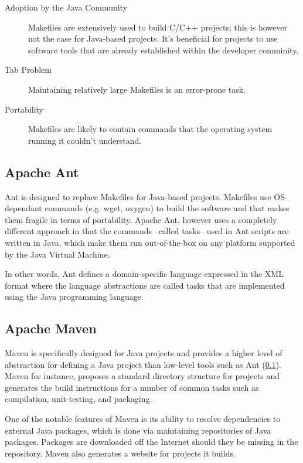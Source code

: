 \begin{description}
\item[Adoption by the Java Community] 
Makefiles are extensively used to build C/C++ projects; this is however
not the case for Java-based projects. It's beneficial for projects
to use software tools that are already established within the
developer comminity.
\item[Tab Problem]
Maintaining relatively large Makefiles is an error-prone task.
\item[Portability]
Makefiles are likely to contain commands that the operating system
running it couldn't understand.
\end{description}

\subsection{Apache Ant}\label{BuildSystemToolsAnt}
Ant is designed to replace Makefiles for Java-based projects. Makefiles use
OS-dependant commands (e.g. wget, oxygen) to build the software and that
makes them fragile in terms of portability. Apache Ant, however uses
a completely different approach in that the commands --called tasks--
used in Ant scripts are written in Java, which make them run out-of-the-box
on any platform supported by the Java Virtual Machine.

In other words, Ant defines a domain-specific language expressed in the
XML format where the language abstractions are called tasks that are 
implemented using the Java programming language.

\subsection{Apache Maven}\label{BuildSystemToolsMaven}
Maven is specifically designed for Java projects and provides a higher
level of abstraction for defining a Java project than low-level tools
such as Ant (\ref{BuildSystemToolsAnt}). 
Maven for instance, proposes a standard directory structure
for projects and generates the build instructions for a number of 
common tasks such as compilation, unit-testing, and packaging.

One of the notable features of Maven is its ability to resolve
dependencies to external Java packages, which is done via
maintaining repositories of Java packages. Packages are downloaded
off the Internet should they be missing in the repository. Maven 
also generates a website for projects it builds.

